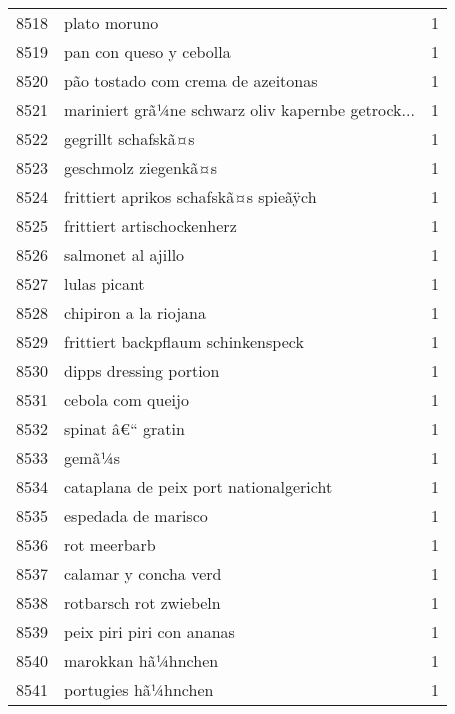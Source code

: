 \begin{tabular}{llr}
8518 &                                       plato moruno &      1 \\
8519 &                            pan con queso y cebolla &      1 \\
8520 &                 pão tostado com crema de azeitonas &      1 \\
8521 &  mariniert grã¼ne schwarz oliv kapernbe getrock... &      1 \\
8522 &                                gegrillt schafskã¤s &      1 \\
8523 &                               geschmolz ziegenkã¤s &      1 \\
8524 &              frittiert aprikos schafskã¤s spieãÿch &      1 \\
8525 &                         frittiert artischockenherz &      1 \\
8526 &                                 salmonet al ajillo &      1 \\
8527 &                                       lulas picant &      1 \\
8528 &                              chipiron a la riojana &      1 \\
8529 &                 frittiert backpflaum schinkenspeck &      1 \\
8530 &                             dipps dressing portion &      1 \\
8531 &                                  cebola com queijo &      1 \\
8532 &                                  spinat â€“ gratin &      1 \\
8533 &                                             gemã¼s &      1 \\
8534 &             cataplana de peix port nationalgericht &      1 \\
8535 &                                espedada de marisco &      1 \\
8536 &                                       rot meerbarb &      1 \\
8537 &                              calamar y concha verd &      1 \\
8538 &                             rotbarsch rot zwiebeln &      1 \\
8539 &                          peix piri piri con ananas &      1 \\
8540 &                                 marokkan hã¼hnchen &      1 \\
8541 &                                portugies hã¼hnchen &      1 \\

\end{tabular}
